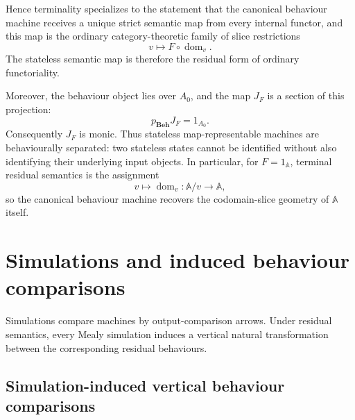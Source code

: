 Hence terminality specializes to the statement that the canonical behaviour
machine receives a unique strict semantic map from every internal functor,
and this map is the ordinary category-theoretic family of slice restrictions
\[
    v\longmapsto F\circ\operatorname{dom}_v.
\]
The stateless semantic map is therefore the residual form of ordinary functoriality.

Moreover, the behaviour object lies over \(A_0\), and the map \(J_F\) is a section of this projection:
\[
    p_{\mathbf{Beh}}J_F=1_{A_0}.
\]
Consequently \(J_F\) is monic. Thus stateless map-representable machines are behaviourally separated: two stateless states cannot be identified without also identifying their underlying input objects. In particular, for \(F=1_{\mathbb A}\), terminal residual semantics is the assignment
\[
    v\longmapsto \operatorname{dom}_v:\mathbb A/v\to\mathbb A,
\]
so the canonical behaviour machine recovers the codomain-slice geometry of \(\mathbb A\) itself.

\section{Simulations and induced behaviour comparisons}
\label{sec:simulations-and-behaviour-comparisons}

Simulations compare machines by output-comparison arrows. Under residual semantics, every Mealy simulation induces a vertical natural transformation between the corresponding residual behaviours.

\subsection{Simulation-induced vertical behaviour comparisons}
\label{subsec:simulation-induced-behaviour-comparisons}

